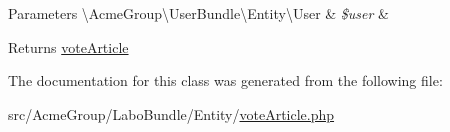 \begin{DoxyParams}[1]{Parameters}
\textbackslash{}\+Acme\+Group\textbackslash{}\+User\+Bundle\textbackslash{}\+Entity\textbackslash{}\+User & {\em \$user} & \\
\hline
\end{DoxyParams}
\begin{DoxyReturn}{Returns}
\hyperlink{class_acme_group_1_1_labo_bundle_1_1_entity_1_1vote_article}{vote\+Article} 
\end{DoxyReturn}


The documentation for this class was generated from the following file\+:\begin{DoxyCompactItemize}
\item 
src/\+Acme\+Group/\+Labo\+Bundle/\+Entity/\hyperlink{vote_article_8php}{vote\+Article.\+php}\end{DoxyCompactItemize}
